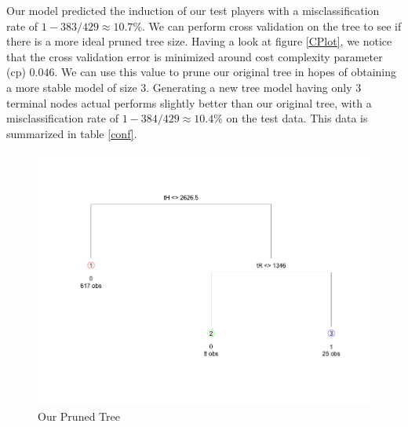 \documentclass[preprint,12pt]{elsarticle}
\begin{document}
Our model predicted the induction of our test players with a misclassification rate of $1 - 383/429 \approx 10.7\%$. We can perform cross validation on the tree to see if there is a more ideal pruned tree size. Having a look at figure \ref{CPlot}, we notice that the cross validation error is minimized around cost complexity parameter (cp) $0.046$. We can use this value to prune our original tree in hopes of obtaining a more stable model of size 3. Generating a new tree model having only 3 terminal nodes actual performs slightly better than our original tree, with a misclassification rate of $1-384/429 \approx 10.4\%$ on the test data. This data is summarized in table \ref{conf}.




\begin{figure}[h]
       \centering 
       \includegraphics[width=\linewidth]{BattersPruned}
       \caption{Our Pruned Tree}
       \label{pruned}
 \end{figure}


\end{document}
